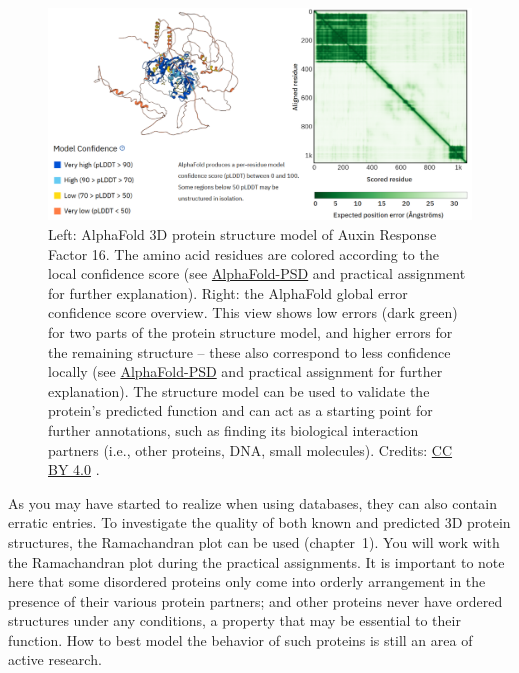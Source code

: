 \begin{figure}[!htbp]
\centering
\includegraphics[width=0.7\linewidth]{files/arf16-c9eeddfe789bb86e7885fb020d6238b2.png}
\caption[]{Left: AlphaFold 3D protein structure model of Auxin Response Factor 16.
The amino acid residues are colored according to the local confidence score (see \href{https://alphafold.ebi.ac.uk/entry/A3B9A0\#help}{AlphaFold-PSD} and practical assignment for further explanation).
Right: the AlphaFold global error confidence score overview.
This view shows low errors (dark green) for two parts of the protein structure model, and higher errors for the remaining structure -- these also correspond to less confidence locally (see \href{https://alphafold.ebi.ac.uk/entry/A3B9A0\#help}{AlphaFold-PSD} and practical assignment for further explanation).
The structure model can be used to validate the protein's predicted function and can act as a starting point for further annotations, such as finding its biological interaction partners (i.e., other proteins, DNA, small molecules).
Credits: \href{https://creativecommons.org/licenses/by/4.0/}{CC BY 4.0} \cite{arf16_2022}.}
\label{arf16}
\end{figure}

As you may have started to realize when using databases, they can also contain erratic entries.
To investigate the quality of both known and predicted 3D protein structures, the Ramachandran plot can be used (chapter~1).
You will work with the Ramachandran plot during the practical assignments.
It is important to note here that some disordered proteins only come into orderly arrangement in the presence of their various protein partners; and other proteins never have ordered structures under any conditions, a property that may be essential to their function.
How to best model the behavior of such proteins is still an area of active research.

